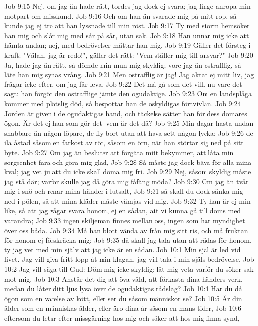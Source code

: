 Job 9:15  Nej, om jag än hade rätt, tordes jag dock ej svara; jag finge anropa min motpart om misskund.
Job 9:16  Och om han än svarade mig på mitt rop, så kunde jag ej tro att han lyssnade till min röst.
Job 9:17  Ty med storm hemsöker han mig och slår mig med sår på sår, utan sak.
Job 9:18  Han unnar mig icke att hämta andan; nej, med bedrövelser mättar han mig.
Job 9:19  Gäller det försteg i kraft: "Välan, jag är redo!", gäller det rätt: "Vem ställer mig till ansvar?"
Job 9:20  Ja, hade jag än rätt, så dömde min mun mig skyldig; vore jag än ostrafflig, så läte han mig synas vrång.
Job 9:21  Men ostrafflig är jag! Jag aktar ej mitt liv, jag frågar icke efter, om jag får leva.
Job 9:22  Det må gå som det vill, nu vare det sagt: han förgör den ostrafflige jämte den ogudaktige.
Job 9:23  Om en landsplåga kommer med plötslig död, så bespottar han de oskyldigas förtvivlan.
Job 9:24  Jorden är given i de ogudaktigas hand, och täckelse sätter han för dess domares ögon. Är det ej han som gör det, vem är det då?
Job 9:25  Min dagar hasta undan snabbare än någon löpare, de fly bort utan att hava sett någon lycka;
Job 9:26  de ila åstad såsom en farkost av rör, såsom en örn, när han störtar sig ned på sitt byte.
Job 9:27  Om jag än besluter att förgäta mitt bekymmer, att låta min sorgsenhet fara och göra mig glad,
Job 9:28  Så måste jag dock bäva för alla mina kval; jag vet ju att du icke skall döma mig fri.
Job 9:29  Nej, såsom skyldig måste jag stå där; varför skulle jag då göra mig fåfäng möda?
Job 9:30  Om jag än tvår mig i snö och renar mina händer i lutsalt,
Job 9:31  så skall du dock sänka mig ned i pölen, så att mina kläder måste vämjas vid mig.
Job 9:32  Ty han är ej min like, så att jag vågar svara honom, ej en sådan, att vi kunna gå till doms med varandra;
Job 9:33  ingen skiljeman finnes mellan oss, ingen som har myndighet över oss båda.
Job 9:34  Må han blott vända av från mig sitt ris, och må fruktan för honom ej förskräcka mig;
Job 9:35  då skall jag tala utan att rädas för honom, ty jag vet med min själv att jag icke är en sådan.
Job 10:1  Min själ är led vid livet. Jag vill giva fritt lopp åt min klagan, jag vill tala i min själs bedrövelse.
Job 10:2  Jag vill säga till Gud: Döm mig icke skyldig; låt mig veta varför du söker sak mot mig.
Job 10:3  Anstår det dig att öva våld, att förkasta dina händers verk, medan du låter ditt ljus lysa över de ogudaktigas rådslag?
Job 10:4  Har du då ögon som en varelse av kött, eller ser du såsom människor se?
Job 10:5  Är din ålder som en människas ålder, eller äro dina år såsom en mans tider,
Job 10:6  eftersom du letar efter missgärning hos mig och söker att hos mig finna synd,
